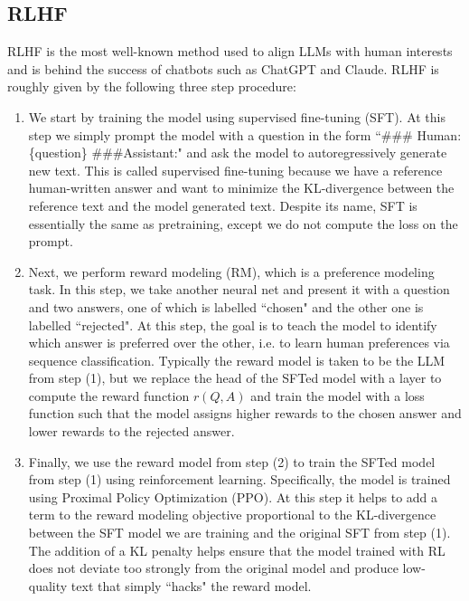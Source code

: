 \documentclass[11pt, oneside]{article}   	%
\begin{document}
 \subsection{RLHF}
RLHF is the most well-known method used to align LLMs with human interests and is behind the success of chatbots such as ChatGPT and Claude.
RLHF is roughly given by the following three step procedure:
\begin{enumerate}
\item We start by training the model using supervised fine-tuning (SFT). At this step we simply prompt the model with a question in the form ``\#\#\# Human: \{question\} \#\#\#Assistant:" and ask the model to autoregressively generate new text. This is called supervised fine-tuning because we have a reference human-written answer and want to minimize the KL-divergence between the reference text and the model generated text. Despite its name, SFT is essentially the same as pretraining, except we do not compute the loss on the prompt.

\item Next, we perform reward modeling (RM), which is a preference modeling task.
In this step, we take another neural net and present it with a question and two answers, one of which is labelled ``chosen" and the other one is labelled ``rejected".
At this step, the goal is to teach the model to identify which answer is preferred over the other, i.e. to learn human preferences via sequence classification. 
Typically the reward model is taken to be the LLM from step (1), but we replace the head of the SFTed model with a layer to compute the reward function $r(Q,A)$ and train the model with a loss function such that the model assigns higher rewards to the chosen answer and lower rewards to the rejected answer. 

\item Finally, we use the reward model from step (2) to train the SFTed model from step (1) using reinforcement learning.
Specifically, the model is trained using Proximal Policy Optimization (PPO).
At this step it helps to add a term to the reward modeling objective proportional to the KL-divergence between the SFT model we are training and the original SFT from step (1).
The addition of a KL penalty helps ensure that the model trained with RL does not deviate too strongly from the original model and produce low-quality text that simply ``hacks" the reward model.
\end{enumerate}
\end{document}
